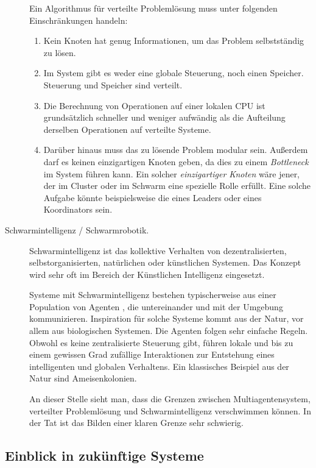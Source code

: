 \begin{description}
	Ein Algorithmus für verteilte Problemlösung muss unter folgenden Einschränkungen handeln:
	\begin{enumerate}
		\item Kein Knoten hat genug Informationen, um das Problem selbstständig zu lösen.
		
		\item Im System gibt es weder eine globale Steuerung, noch einen Speicher. Steuerung und Speicher sind verteilt.
		
		\item Die Berechnung von Operationen auf einer lokalen CPU ist grundsätzlich schneller und weniger aufwändig als die Aufteilung derselben Operationen auf verteilte Systeme.
		
		\item Darüber hinaus muss das zu lösende Problem modular sein. Außerdem darf es keinen einzigartigen Knoten geben, da dies zu einem \textit{Bottleneck} im System führen kann. Ein solcher \textit{einzigartiger Knoten} wäre jener, der im Cluster oder im Schwarm eine spezielle Rolle erfüllt. Eine solche Aufgabe könnte beispielsweise die eines Leaders oder eines Koordinators sein.
	\end{enumerate}
	
	
	\item[Schwarmintelligenz / Schwarmrobotik.] Schwarmintelligenz ist das kollektive Verhalten von dezentralisierten, selbstorganisierten, natürlichen oder künstlichen Systemen. Das Konzept wird sehr oft im Bereich der Künstlichen Intelligenz eingesetzt.
	
	Systeme mit Schwarmintelligenz bestehen typischerweise aus einer Population von Agenten \cite{Garnier07thebiological}, die untereinander und mit der Umgebung kommunizieren. Inspiration für solche Systeme kommt aus der Natur, vor allem aus biologischen Systemen. Die Agenten folgen sehr einfache Regeln. Obwohl es keine zentralisierte Steuerung gibt, führen lokale und bis zu einem gewissen Grad zufällige Interaktionen zur Entstehung eines intelligenten und globalen Verhaltens. Ein klassisches Beispiel aus der Natur sind Ameisenkolonien.
	
	An dieser Stelle sieht man, dass die Grenzen zwischen Multiagentensystem, verteilter Problemlösung und Schwarmintelligenz verschwimmen können. In der Tat ist das Bilden einer klaren Grenze sehr schwierig.
\end{description}

\subsection{Einblick in zukünftige Systeme}

